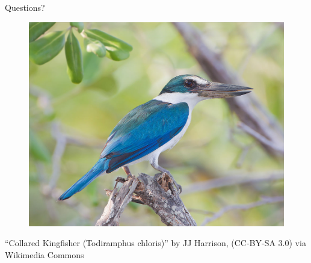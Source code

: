 \documentclass{beamer}
\begin{document}
\begin{frame}{Questions? }
	\begin{figure}
		\centering
		\includegraphics[height=.80\textheight]{../images/kingfisher.jpg}
	\end{figure}
	\tiny
	\begin{center}\color{OSUdkbrn}
	``Collared Kingfisher (Todiramphus chloris)'' by JJ Harrison, (CC-BY-SA 3.0) via  Wikimedia Commons
	\end{center}

\end{frame}
\end{document}
